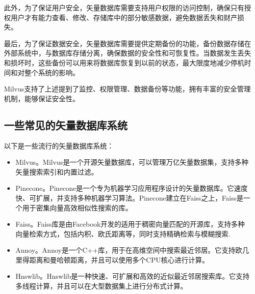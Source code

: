 此外，为了保证用户安全，矢量数据库需要支持用户权限的访问控制，确保只有授权用户才有能力查看、修改、存储库中的部分敏感数据，避免数据丢失和财产损失。

最后，为了保证数据安全，矢量数据库需要提供定期备份的功能，备份数据存储在外部系统中，与数据库存储分离，确保数据的安全性和可恢复性。当数据发生丢失和损坏时，这些备份可以用来将数据库恢复到以前的状态，最大限度地减少停机时间和对整个系统的影响。

Milvus支持了上述提到了监控、权限管理、数据备份等功能，拥有丰富的安全管理机制，能够保证安全性。

\subsection{一些常见的矢量数据库系统}

以下是一些流行的矢量数据库系统：

\begin{itemize}
    \item Milvus。Milvus是一个开源矢量数据库，可以管理万亿矢量数据集，支持多种矢量搜索索引和内置过滤。
    \item Pinecone。Pinecone是一个专为机器学习应用程序设计的矢量数据库。它速度快、可扩展，并支持多种机器学习算法。Pinecone建立在Faiss之上，Faiss是一个用于密集向量高效相似性搜索的库。
    \item Faiss。Faiss库是由Facebook开发的适用于稠密向量匹配的开源库，支持多种向量检索方式，包括内积、欧氏距离等，同时支持精确检索与模糊搜索.
    \item Annoy。Annoy是一个C++库，用于在高维空间中搜索最近邻居。它支持欧几里得距离和曼哈顿距离，并且可以使用多个CPU核心进行计算。
    \item Hnswlib。Hnswlib是一种快速、可扩展和高效的近似最近邻居搜索库。它支持多线程计算，并且可以在大型数据集上进行分布式计算。
\end{itemize}
